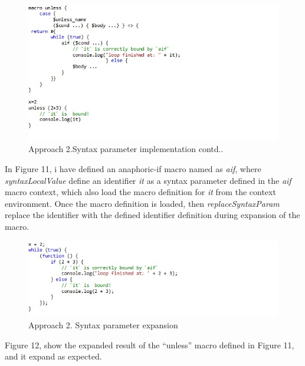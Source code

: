 \newpage
\begin{figure}[htb]
\centering
\includegraphics[width=1.0\textwidth]{images/Appraoch23.jpg}
\caption{ Approach 2.Syntax parameter implementation contd..} 
\label{fig:AST5}
\end{figure}

In Figure 11, i have defined an anaphoric-if macro named as \textit{aif}, where \textit{syntaxLocalValue} define an identifier \textit{it} as a syntax parameter defined in the \textit{aif} macro context, which also load the macro definition for \textit{it} from the context environment. Once the macro definition is loaded, then \textit{replaceSyntaxParam} replace the identifier with the defined identifier definition during expansion of the macro.
 
\begin{figure}[htb]
\centering
\includegraphics[width=1.0\textwidth]{images/Appraoch22.jpg}
\caption{ Approach 2. Syntax parameter expansion} 
\label{fig:AST6}
\end{figure}

Figure 12, show the expanded result of the ``unless'' macro defined in Figure 11, and it expand as expected.

